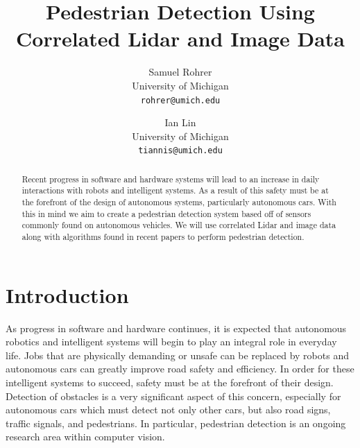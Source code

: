 \documentclass[10pt,twocolumn,letterpaper]{article}
\begin{document}
\title{Pedestrian Detection Using Correlated Lidar and Image Data}

\author{Samuel Rohrer\\
University of Michigan\\
{\tt\small rohrer@umich.edu}
\and
Ian Lin\\
University of Michigan\\
{\tt\small tiannis@umich.edu}
}

\maketitle

\begin{abstract}
  Recent progress in software and hardware systems will lead to an increase in
  daily interactions with robots and intelligent systems. As a result of this
  safety must be at the forefront of the design of autonomous systems,
  particularly autonomous cars. With this in mind we aim to create a pedestrian
  detection system based off of sensors commonly found on autonomous vehicles.
  We will use correlated Lidar and image data along with algorithms found in
  recent papers to perform pedestrian detection.

\end{abstract}

\section{Introduction}

  As progress in software and hardware continues, it is expected that
  autonomous robotics and intelligent systems will begin to play an integral
  role in everyday life. Jobs that are physically demanding or unsafe can be
  replaced by robots and autonomous cars can greatly improve road safety and
  efficiency. In order for these intelligent systems to succeed, safety must
  be at the forefront of their design. Detection of obstacles is a very
  significant aspect of this concern, especially for autonomous cars which
  must detect not only other cars, but also road signs, traffic signals, and
  pedestrians. In particular, pedestrian detection is an ongoing research
  area within computer vision.
\end{document}
